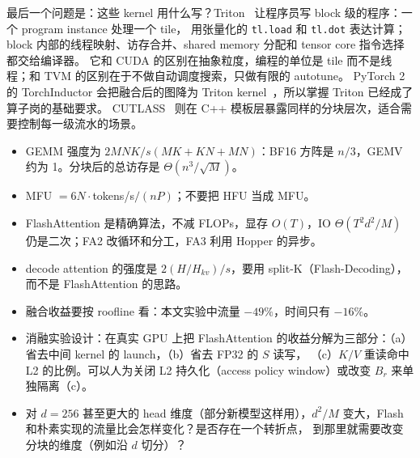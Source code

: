 最后一个问题是：这些 kernel 用什么写？Triton~\cite{tillet2019triton} 让程序员写 block 级的程序：一个 program instance 处理一个 tile，
用张量化的 \texttt{tl.load} 和 \texttt{tl.dot} 表达计算；block 内部的线程映射、访存合并、shared memory 分配和 tensor core 指令选择都交给编译器。
它和 CUDA 的区别在抽象粒度，编程的单位是 tile 而不是线程；和 TVM 的区别在于不做自动调度搜索，只做有限的 autotune。
PyTorch 2 的 TorchInductor 会把融合后的图降为 Triton kernel~\cite{ansel2024pytorch2}，所以掌握 Triton 已经成了算子岗的基础要求。
CUTLASS~\cite{cutlass} 则在 C++ 模板层暴露同样的分块层次，适合需要控制每一级流水的场景。

\begin{keypts}
\begin{itemize}
\item GEMM 强度为 $2MNK/s(MK+KN+MN)$：BF16 方阵是 $n/3$，GEMV 约为 1。分块后的总访存是 $\Theta(n^3/\sqrt{M})$。
\item MFU $=6N\cdot$tokens/s$/(nP)$；不要把 HFU 当成 MFU。
\item FlashAttention 是精确算法，不减 FLOPs，显存 $O(T)$，IO $\Theta(T^2d^2/M)$ 仍是二次；FA2 改循环和分工，FA3 利用 Hopper 的异步。
\item decode attention 的强度是 $2(H/H_{kv})/s$，要用 split-K（Flash-Decoding），而不是 FlashAttention 的思路。
\item 融合收益要按 roofline 看：本文实验中流量 $-49\%$，时间只有 $-16\%$。
\end{itemize}
\end{keypts}

\begin{research}
\begin{itemize}
\item 消融实验设计：在真实 GPU 上把 FlashAttention 的收益分解为三部分：（a）省去中间 kernel 的 launch，（b）省去 FP32 的 $S$ 读写，
（c）$K/V$ 重读命中 L2 的比例。可以人为关闭 L2 持久化（access policy window）或改变 $B_r$ 来单独隔离（c）。
\item 对 $d=256$ 甚至更大的 head 维度（部分新模型这样用），$d^2/M$ 变大，Flash 和朴素实现的流量比会怎样变化？是否存在一个转折点，
到那里就需要改变分块的维度（例如沿 $d$ 切分）？
\end{itemize}
\end{research}
